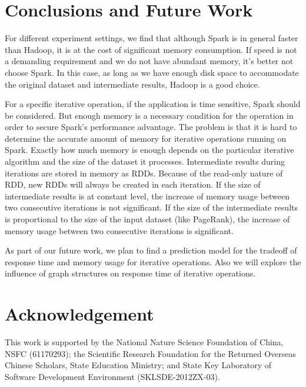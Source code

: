 \documentclass[12pt,conference,letterpaper]{IEEEtran}
\begin{document}
\section{Conclusions and Future Work}
\label{sec:concl_fw}

For different experiment settings,  we find that although Spark is in general faster than Hadoop, it is at the cost of significant memory consumption. If speed is not a demanding requirement and we do not have abundant memory, it's better not choose Spark.  In this case, as long as we have enough disk space to accommodate the original dataset and intermediate results, Hadoop is a good choice.

For a specific iterative operation, if the application is time sensitive, Spark should be considered. But  enough memory is a necessary condition for the operation in order to secure Spark's performance advantage. The problem is that it is hard to determine the accurate amount of memory for iterative operations running on Spark. Exactly how much memory is enough depends on the particular iterative algorithm and the size of the dataset it processes. Intermediate results during iterations are stored in memory as RDDs. Because of the read-only nature of RDD, new RDDs will always be created in each iteration. If the size of intermediate results is at constant level, the increase of memory usage between two consecutive iterations is not significant. If the size of the intermediate results is proportional to the size of the input dataset (like PageRank), the increase of memory usage between two consecutive iterations is significant.

As part of our future work, we plan to find a prediction model for the tradeoff of response time and memory usage for iterative operations. Also we will explore the influence of graph structures on response time of iterative operations.


\section*{Acknowledgement}
This work is supported by the National Nature Science Foundation of China, NSFC (61170293); the Scientific Research Foundation for the Returned Overseas Chinese Scholars, State Education Ministry; and State Key Laboratory of Software Development Environment (SKLSDE-2012ZX-03).
\end{document}
